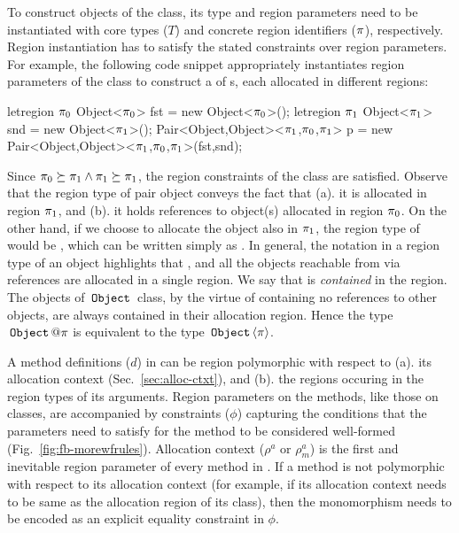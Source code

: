 To construct objects of the  class, its type and region
parameters need to be instantiated with core types ($T$) and concrete
region identifiers ($\pi$), respectively. Region instantiation has to
satisfy the stated constraints over region parameters. For example,
the following code snippet appropriately instantiates region
parameters of the  class to construct a  of
{\ObjZ}{\!}s, each allocated in different regions:
\begin{codejava}
letregion $\pi_0$ {
  Object<$\pi_0$> fst = new Object<$\pi_0$>();
  letregion $\pi_1$ {
    Object<$\pi_1$> snd = new Object<$\pi_1$>();
    Pair<Object,Object><$\pi_1$,$\pi_0$,$\pi_1$> p = 
       new Pair<Object,Object><$\pi_1$,$\pi_0$,$\pi_1$>(fst,snd);
  }
}
\end{codejava}
Since $\pi_0 \succeq \pi_1 \wedge \pi_1 \succeq \pi_1$, the
region constraints of the  class are satisfied. Observe that
the region type of pair object  conveys the fact that (a). it is
allocated in region $\pi_1$, and (b). it holds references to
object(s) allocated in region $\pi_0$. On the other hand, if we
choose to allocate the  object also in $\pi_1$, the region
type of  would be
, which can be
written simply as . In general, the
 notation in a region type of an object  highlights that
, and all the objects reachable from  via references are
allocated in a single region. We say that  is \emph{contained} in
the region. The objects of $\,{\tt Object}\,$ class, by the virtue of
containing no references to other objects, are always contained in
their allocation region. Hence the type $\ObjZ@\rgn$ is equivalent to
the type $\,{\tt Object}\,\langle \pi \rangle$.

A method definitions ($d$) in \fbname can be region polymorphic with
respect to (a). its allocation context (Sec.~\ref{sec:alloc-ctxt}),
and (b). the regions occuring in the region types of its arguments.
Region parameters on the methods, like those on classes, are
accompanied by constraints ($\phi$) capturing the conditions that the
parameters need to satisfy for the method to be considered well-formed
(Fig.~\ref{fig:fb-morewfrules}). Allocation context ($\rho^a$ or
$\rho^a_m$) is the first and inevitable region parameter of every
method in \FB. If a method is not polymorphic with respect to its
allocation context (for example, if its allocation context needs to be
same as the allocation region of its class), then the monomorphism
needs to be encoded as an explicit equality constraint in $\phi$.  

